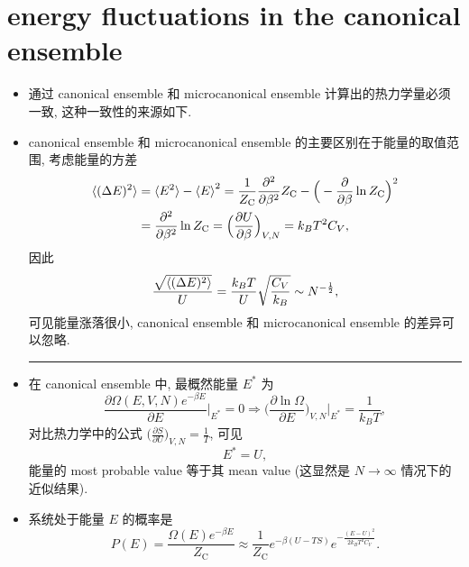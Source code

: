 \section{energy fluctuations in the canonical ensemble}
\begin{itemize}
	\item 通过 canonical ensemble 和 microcanonical ensemble 计算出的热力学量必须一致, 这种一致性的来源如下.
	
	\item canonical ensemble 和 microcanonical ensemble 的主要区别在于能量的取值范围, 考虑能量的方差
	\begin{align}
		\braket{(\Delta E)^2} &= \braket{E^2} - \braket{E}^2 = \frac{1}{Z_\text{C}} \frac{\partial^2}{\partial \beta^2} Z_\text{C} - \Big( - \frac{\partial}{\partial \beta} \ln Z_\text{C} \Big)^2 \notag \\
		&= \frac{\partial^2}{\partial \beta^2} \ln Z_\text{C} = \Big( \frac{\partial U}{\partial \beta} \Big)_{V, N} = k_B T^2 C_V,
	\end{align}
	因此
	\begin{equation}
		\frac{\sqrt{\braket{(\Delta E)^2}}}{U} = \frac{k_B T}{U} \sqrt{\frac{C_V}{k_B}} \sim N^{- \frac{1}{2}},
	\end{equation}
	可见能量涨落很小, canonical ensemble 和 microcanonical ensemble 的差异可以忽略.
	
	\noindent\rule[0.5ex]{\linewidth}{0.5pt} %
	
	\item 在 canonical ensemble 中, 最概然能量 $E^*$ 为
	\begin{equation}
		\frac{\partial \Omega(E, V, N) e^{- \beta E}}{\partial E} \Big|_{E^*} = 0 \Longrightarrow \Big( \frac{\partial \ln \Omega}{\partial E} \Big)_{V, N} \Big|_{E^*} = \frac{1}{k_B T},
	\end{equation}
	对比热力学中的公式 $\big( \frac{\partial S}{\partial U} \big)_{V, N} = \frac{1}{T}$, 可见
	\begin{equation}
		E^* = U,
	\end{equation}
	能量的 most probable value 等于其 mean value (这显然是 $N \rightarrow \infty$ 情况下的近似结果).
	
	\item 系统处于能量 $E$ 的概率是
	\begin{equation}
		P(E) = \frac{\Omega(E) e^{- \beta E}}{Z_\text{C}} \approx \frac{1}{Z_\text{C}} e^{- \beta (U - T S)} e^{- \frac{(E - U)^2}{2 k_B T^2 C_V}}.
	\end{equation}
	

\end{itemize}
